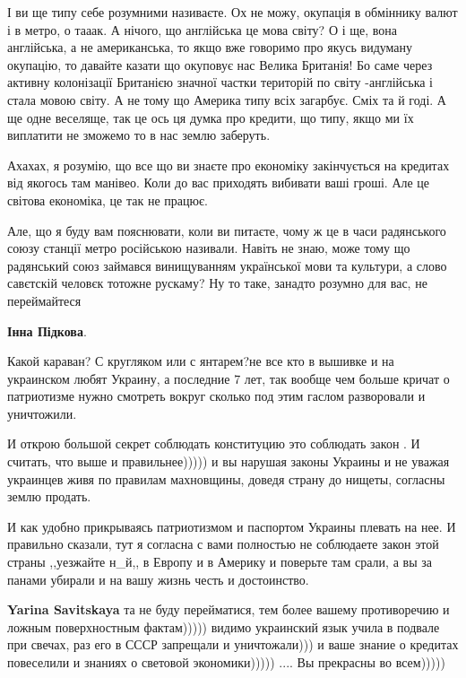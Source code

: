 \begin{itemize}
\begin{itemize}
І ви ще типу себе розумними називаєте. Ох не можу, окупація в обміннику валют і
в метро, о тааак. А нічого, що англійська це мова світу? О і ще, вона
англійська, а не американська, то якщо вже говоримо про якусь видуману
окупацію, то давайте казати що окуповує нас Велика Британія! Бо саме через
активну колонізації Британією значної частки територій по світу -англійська і
стала мовою світу. А не тому що Америка типу всіх загарбує. Сміх та й годі. А
ще одне веселяще, так це ось ця думка про кредити, що типу, якщо ми їх
виплатити не зможемо то в нас землю заберуть. 

Ахахах, я розумію, що все що ви знаєте про економіку закінчується на кредитах
від якогось там манівео. Коли до вас приходять вибивати ваші гроші. Але це
світова економіка, це так не працює.

Але, що я буду вам пояснювати, коли ви питаєте, чому ж це в часи радянського
союзу станції метро російською називали. Навіть не знаю, може тому що
радянський союз займався винищуванням української мови та культури, а слово
савєтскій человєк тотожне рускаму? Ну то таке, занадто розумно для вас, не
переймайтеся


\textbf{Інна Підкова}. 

Какой караван? С кругляком или с янтарем?не все кто в вышивке и на украинском
любят Украину, а последние 7 лет, так вообще чем больше кричат о патриотизме
нужно смотреть вокруг сколько под этим гаслом разворовали и уничтожили. 

И открою большой секрет соблюдать конституцию это соблюдать закон . И считать,
что выше и правильнее))))) и вы нарушая законы Украины и не уважая украинцев
живя по правилам махновщины, доведя страну до нищеты, согласны землю продать. 

И как удобно прикрываясь патриотизмом и паспортом Украины плевать на нее. И
правильно сказали, тут я согласна с вами полностью не соблюдаете закон этой
страны ,,уезжайте н\_й,, в Европу и в Америку и поверьте там срали, а вы за
панами убирали и на вашу жизнь честь и достоинство.



\textbf{Yarina Savitskaya} та не буду перейматися, тем более вашему
противоречию и ложным поверхностным фактам))))) видимо украинский язык учила в
подвале при свечах, раз его в СССР запрещали и уничтожали))) и ваше знание о
кредитах повеселили и знаниях о световой экономики))))) .... Вы прекрасны во
всем)))))


\end{itemize}
\end{itemize}
